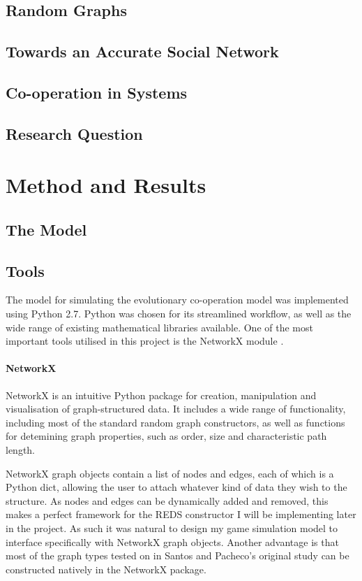 \documentclass[a4paper, 12pt, notitlepage]{report}
\numberwithin{equation}{subsection}
\theoremstyle{definition}
\theoremstyle{theorem}
\theoremstyle{definition}
\begin{document}
\chapter{Random Graphs}

\chapter{Towards an Accurate Social Network}

\chapter{Co-operation in Systems}

\chapter{Research Question}

\part{Method and Results}

\chapter{The Model}


\chapter{Tools}

The model for simulating the evolutionary co-operation model was implemented using Python 2.7. Python was chosen for its streamlined workflow, as well as the wide range of existing mathematical libraries available. One of the most important tools utilised in this project is the NetworkX module \cite{networkx}.

\subsection{NetworkX}

NetworkX is an intuitive Python package for creation, manipulation and visualisation of graph-structured data. It includes a wide range of functionality, including most of the standard random graph constructors, as well as functions for detemining graph properties, such as order, size and characteristic path length.

NetworkX graph objects contain a list of nodes and edges, each of which is a Python dict, allowing the user to attach whatever kind of data they wish to the structure. As nodes and edges can be dynamically added and removed, this makes a perfect framework for the REDS constructor I will be implementing later in the project. As such it was natural to design my game simulation model to interface specifically with NetworkX graph objects. Another advantage is that most of the graph types tested on in Santos and Pacheco's original study \cite{santosorig} can be constructed natively in the NetworkX package. 
\end{document}
